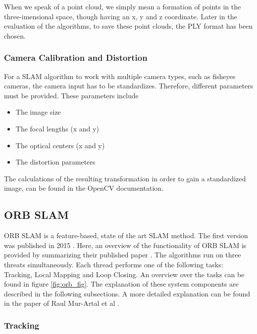 		When we speak of a point cloud, we simply mean a formation of points in the three-imensional space, though having
		an x, y and z coordinate. Later in the evaluation of the algorithms, to save these point clouds, the PLY format has 
		been chosen. 
		
		\subsubsection{Camera Calibration and Distortion} \label{camcalib}
		
		For a SLAM algorithm to work with multiple camera types, such as fisheyes cameras, the camera input has to be standardizes. Therefore, different 
		parameters must be provided. These parameters include 
		
		\begin{itemize}
		\item{The image size}
		\item{The focal lengths (x and y)}
		\item{The optical centers (x and y)}
		\item{The distortion parameters}
		\end{itemize}
		
		The calculations of the resulting transformation in order to gain a standardized image, can be found in the OpenCV documentation. 

	\subsection{ORB SLAM}\label{orbcomp}
	
	ORB SLAM is a feature-based, state of the art SLAM method. The first version was published in 2015 \cite{orb}. 
	Here, an overview of the functionality of ORB SLAM is provided by summarizing their published paper \cite{orb}. The algorithms run on three threats simultaneously.
	Each thread performs one of the following tasks: Tracking, Local Mapping and Loop Closing. An overview over the tasks can be found 
	in figure \ref{fig:orb_fig}. The explanation of these system components are described in the following subsections. 
	A more detailed explanation can be found in the paper of Raul Mur-Artal et al \cite{orb}.
	
	
	\subsubsection{Tracking}
	
